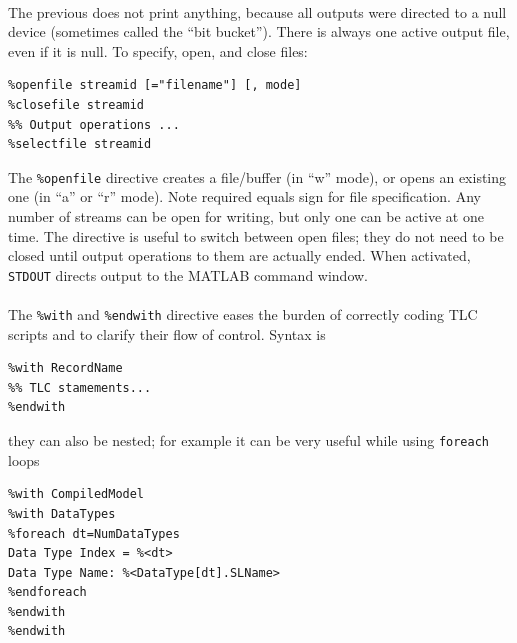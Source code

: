 \paragraph{} The previous does not print anything, because all outputs were directed to a null device (sometimes called the “bit bucket”). There is always one active output file, even if it is null. To specify, open, and close files:
\begin{verbatim}
%openfile streamid [="filename"] [, mode]
%closefile streamid
%% Output operations ...
%selectfile streamid
\end{verbatim}
The \verb|%openfile| directive creates a file/buffer (in “w” mode), or opens an existing one (in “a” or “r” mode). Note required equals sign for file specification. Any number of streams can be open for writing, but only one can be active at one time. The directive is useful to switch between open files; they do not need to be closed until output operations to them are actually ended. When activated, \verb|STDOUT| directs output to the MATLAB command window.

\paragraph{} The \verb|%with| and \verb|%endwith| directive eases the burden of correctly coding TLC scripts and to clarify their flow of control. Syntax is
\begin{verbatim}
%with RecordName
%% TLC stamements...
%endwith
\end{verbatim}
they can also be nested; for example it can be very useful while using \verb|foreach| loops
\begin{lstlisting}
%with CompiledModel
%with DataTypes
%foreach dt=NumDataTypes
Data Type Index = %<dt>
Data Type Name: %<DataType[dt].SLName>
%endforeach
%endwith
%endwith
\end{lstlisting}

